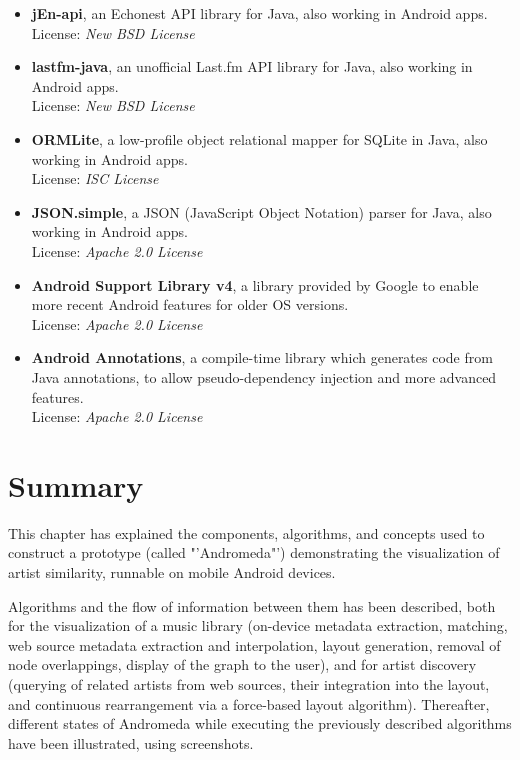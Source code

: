 \begin{itemize}
	
	\item \textbf{jEn-api}, an Echonest API library for Java, also working in Android apps. \\
License: \emph{New BSD License}

	\item \textbf{lastfm-java}, an unofficial Last.fm API library for Java, also working in Android apps. \\
License: \emph{New BSD License}

	\item \textbf{ORMLite}, a low-profile object relational mapper for SQLite in Java, also working in Android apps. \\
License: \emph{ISC License}

	\item \textbf{JSON.simple}, a JSON (JavaScript Object Notation) parser for Java, also working in Android apps. \\
License: \emph{Apache 2.0 License}

	\item \textbf{Android Support Library v4}, a library provided by Google to enable more recent Android features for older OS versions. \\
License: \emph{Apache 2.0 License}

	\item \textbf{Android Annotations}, a compile-time library which generates code from Java annotations, to allow pseudo-dependency injection and more advanced features. \\
License: \emph{Apache 2.0 License}

\end{itemize}

\section{Summary}

This chapter has explained the components, algorithms, and concepts used to construct a prototype (called "'Andromeda"') demonstrating the visualization of artist similarity, runnable on mobile Android devices.

Algorithms and the flow of information between them has been described, both for the visualization of a music library (on-device metadata extraction, matching, web source metadata extraction and interpolation, layout generation, removal of node overlappings, display of the graph to the user), and for artist discovery (querying of related artists from web sources, their integration into the layout, and continuous rearrangement via a force-based layout algorithm).
Thereafter, different states of Andromeda while executing the previously described algorithms have been illustrated, using screenshots.

